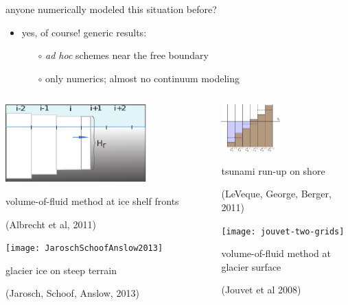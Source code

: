 \documentclass[xcolor={dvipsnames}]{beamer}
\begin{document}
\begin{frame}{anyone numerically modeled this situation before?}

\vspace{-2mm}

\begin{itemize}
\item yes, of course!  generic results:
    \begin{itemize}
    \item[$\circ$] \emph{ad hoc} schemes near the free boundary
    \item[$\circ$] only numerics; almost no continuum modeling
    \end{itemize}
\end{itemize}

\medskip
\begin{columns}
\begin{column}{0.45\textwidth}
\includegraphics[width=0.7\textwidth,keepaspectratio=true]{Albrechtetal2011half}

\scriptsize volume-of-fluid method at ice shelf fronts

\tiny (Albrecht et al, 2011)

\medskip
\texttt{[image: JaroschSchoofAnslow2013]}

\scriptsize glacier ice on steep terrain

\smallskip
\tiny (Jarosch, Schoof, Anslow, 2013)
\end{column}

\begin{column}{0.5\textwidth}
\hfill \includegraphics[width=0.45\textwidth,keepaspectratio=true]{LeVequeGeorgeBerger2011}

\hfill \scriptsize tsunami run-up on shore

\smallskip
\hfill \tiny (LeVeque, George, Berger, 2011)

\medskip
\hfill \texttt{[image: jouvet-two-grids]}

\hfill \scriptsize volume-of-fluid method at glacier surface

\hfill \tiny (Jouvet et al 2008)
\end{column}
\end{columns}
\end{frame}
\end{document}
